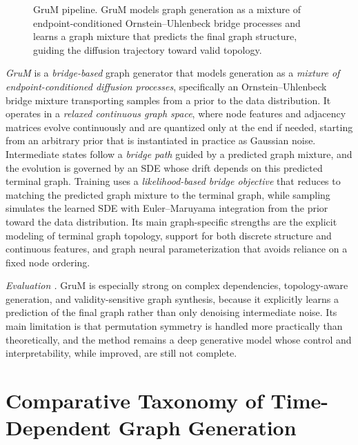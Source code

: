 \documentclass{article}
\begin{document}
\begin{figure}[htbp]
\caption{GruM pipeline. GruM models graph generation as a mixture of endpoint-conditioned Ornstein--Uhlenbeck bridge processes and learns a graph mixture that predicts the final graph structure, guiding the diffusion trajectory toward valid topology.}
\label{fig:grum_pipeline}
\end{figure}

\emph{GruM} \cite{jo2023graph} is a \emph{bridge-based} graph generator that models generation as a \emph{mixture of endpoint-conditioned diffusion processes}, specifically an Ornstein--Uhlenbeck bridge mixture transporting samples from a prior to the data distribution. It operates in a \emph{relaxed continuous graph space}, where node features and adjacency matrices evolve continuously and are quantized only at the end if needed, starting from an arbitrary prior that is instantiated in practice as Gaussian noise. Intermediate states follow a \emph{bridge path} guided by a predicted graph mixture, and the evolution is governed by an SDE whose drift depends on this predicted terminal graph. Training uses a \emph{likelihood-based bridge objective} that reduces to matching the predicted graph mixture to the terminal graph, while sampling simulates the learned SDE with Euler--Maruyama integration from the prior toward the data distribution. Its main graph-specific strengths are the explicit modeling of terminal graph topology, support for both discrete structure and continuous features, and graph neural parameterization that avoids reliance on a fixed node ordering.

\emph{Evaluation .} GruM is especially strong on complex dependencies, topology-aware generation, and validity-sensitive graph synthesis, because it explicitly learns a prediction of the final graph rather than only denoising intermediate noise. Its main limitation is that permutation symmetry is handled more practically than theoretically, and the method remains a deep generative model whose control and interpretability, while improved, are still not complete.

\label{sec:ct_summary}



\section{Comparative Taxonomy of Time-Dependent Graph Generation}
\label{sec:comparative_taxonomy}
\end{document}
